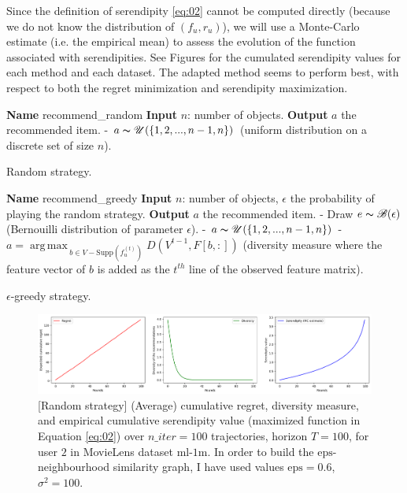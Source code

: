 \documentclass{article}
\DeclareMathOperator*{\argmax}{arg\,max\,}
\begin{document}
Since the definition of serendipity \ref{eq:02} cannot be computed directly (because we do not know the distribution of $(f_{u}, r_{u})$), we will use a Monte-Carlo estimate (i.e. the empirical mean) to assess the evolution of the function associated with serendipities. See Figures for the cumulated serendipity values for each method and each dataset. The adapted method seems to perform best, with respect to both the regret minimization and serendipity maximization.


\begin{algorithm}
\begin{algorithmic}
\STATE \textbf{Name} recommend\_random
\STATE \textbf{Input} $n$: number of objects.
\STATE \textbf{Output} $a$ the recommended item.
\STATE - $a \thicksim \mathscr{U}(\{1, 2, ..., n-1, n\})$ (uniform distribution on a discrete set of size $n$).
\end{algorithmic}
\caption{Random strategy.}
\label{random}
\end{algorithm}

\begin{algorithm}
\begin{algorithmic}
\STATE \textbf{Name} recommend\_greedy
\STATE \textbf{Input} $n$: number of objects, $\epsilon$ the probability of playing the random strategy.
\STATE \textbf{Output} $a$ the recommended item.
\STATE - Draw $e \thicksim \mathscr{B}(\epsilon)$ (Bernouilli distribution of parameter $\epsilon$).
\STATE - $a \thicksim \mathscr{U}(\{1, 2, ..., n-1, n\})$
\ELSE
\STATE - $a = \argmax_{b \in V-\text{Supp}(f^{(t)}_{u})} D(V^{t-1}, F[b, :])$ (diversity measure where the feature vector of $b$ is added as the $t^{th}$ line of the observed feature matrix).
\ENDIF
\end{algorithmic}
\caption{$\epsilon$-greedy strategy.}
\label{greedy}
\end{algorithm}

\begin{figure}[H]
  \centering
  \includegraphics[scale=0.4]{../Results/ml-1m/random-32sec.png}
  \caption{[Random strategy] (Average) cumulative regret, diversity measure, and empirical cumulative serendipity value (maximized function in Equation \ref{eq:02}) over $n\_iter=100$ trajectories, horizon $T=100$, for user $2$ in MovieLens dataset $\text{ml-1m}$. In order to build the $\text{eps}$-neighbourhood similarity graph, I have used values $\text{eps}=0.6$, $\sigma^{2}=100$.}
\label{figrandom}
\end{figure}
\end{document}
